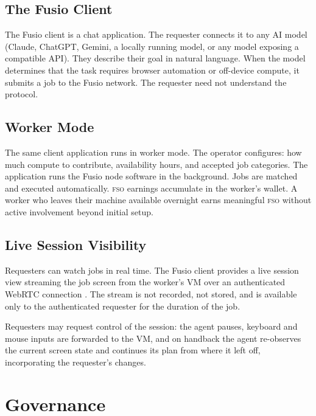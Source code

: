 \documentclass[10pt,twocolumn]{article}
\newcommand{\fso}{\textsc{fso}}
\begin{document}
\subsection{The Fusio Client}

The Fusio client is a chat application. The requester connects it to any AI model (Claude, ChatGPT, Gemini, a locally running model, or any model exposing a compatible API). They describe their goal in natural language. When the model determines that the task requires browser automation or off-device compute, it submits a job to the Fusio network. The requester need not understand the protocol.

\subsection{Worker Mode}

The same client application runs in worker mode. The operator configures: how much compute to contribute, availability hours, and accepted job categories. The application runs the Fusio node software in the background. Jobs are matched and executed automatically. \fso{} earnings accumulate in the worker's wallet. A worker who leaves their machine available overnight earns meaningful \fso{} without active involvement beyond initial setup.

\subsection{Live Session Visibility}

Requesters can watch jobs in real time. The Fusio client provides a live session view streaming the job screen from the worker's VM over an authenticated WebRTC connection \cite{w3c_webrtc}. The stream is not recorded, not stored, and is available only to the authenticated requester for the duration of the job.

Requesters may request control of the session: the agent pauses, keyboard and mouse inputs are forwarded to the VM, and on handback the agent re-observes the current screen state and continues its plan from where it left off, incorporating the requester's changes.

\section{Governance}
\label{sec:governance}
\end{document}
